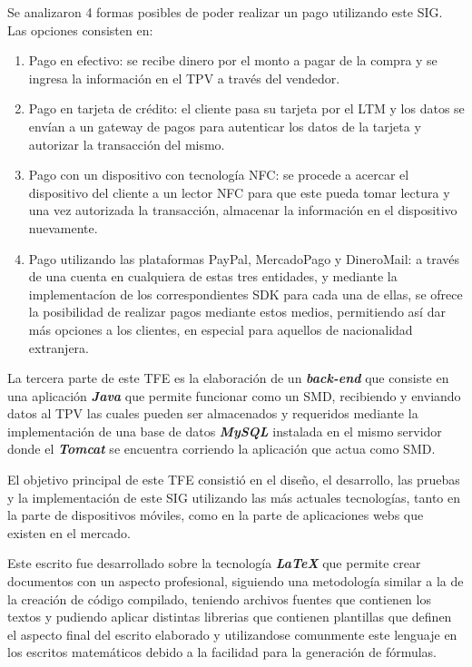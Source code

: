 Se analizaron 4 formas posibles de poder realizar un pago utilizando este \ac{SIG}. Las opciones consisten en:

\begin{enumerate}
\item Pago en efectivo: se recibe dinero por el monto a pagar de la compra y se ingresa la informaci\'on en el \ac{TPV} a trav\'es del vendedor.
\item Pago en tarjeta de cr\'edito: el cliente pasa su tarjeta por el \ac{LTM} y los datos se env\'ian a un gateway de pagos para autenticar los datos de la tarjeta y autorizar la transacci\'on del mismo.
\item Pago con un dispositivo con tecnolog\'ia \ac{NFC}: se procede a acercar el dispositivo del cliente a un lector \ac{NFC} para que este pueda tomar lectura y una vez autorizada la transacci\'on, almacenar la informaci\'on en el dispositivo nuevamente.
\item Pago utilizando las plataformas PayPal\Si{\texttrademark}, MercadoPago\Si{\texttrademark} y DineroMail\Si{\texttrademark}: a trav\'es de una cuenta en cualquiera de estas tres entidades, y mediante la implementac\'ion de los correspondientes \ac{SDK} para cada una de ellas, se ofrece la posibilidad de realizar pagos mediante estos medios, permitiendo as\'i dar m\'as opciones a los clientes, en especial para aquellos de nacionalidad extranjera.
\end{enumerate}

La tercera parte de este \ac{TFE} es la elaboraci\'on de un \textbf{\textit{back-end}} que consiste en una aplicaci\'on \textbf{\textit{Java}} que permite funcionar como un \ac{SMD}, recibiendo y enviando datos al \ac{TPV} las cuales pueden ser almacenados y requeridos mediante la implementaci\'on de una base de datos \textbf{\textit{MySQL}} instalada en el mismo servidor donde el \textbf{\textit{Tomcat}} se encuentra corriendo la aplicaci\'on que actua como \ac{SMD}.

El objetivo principal de este \ac{TFE} consisti\'o en el dise\~no, el desarrollo, las pruebas y la implementaci\'on de este \ac{SIG} utilizando las m\'as actuales tecnolog\'ias, tanto en la parte de dispositivos m\'oviles, como en la parte de aplicaciones webs que existen en el mercado.

Este escrito fue desarrollado sobre la tecnolog\'ia \textbf{\textit{LaTeX}} que permite crear documentos con un aspecto profesional, siguiendo una metodolog\'ia similar a la de la creaci\'on de c\'odigo compilado, teniendo archivos fuentes que contienen los textos y pudiendo aplicar distintas librerias que contienen plantillas que definen el aspecto final del escrito elaborado y utilizandose comunmente este lenguaje en los escritos matem\'aticos debido a la facilidad para la generaci\'on de f\'ormulas.

